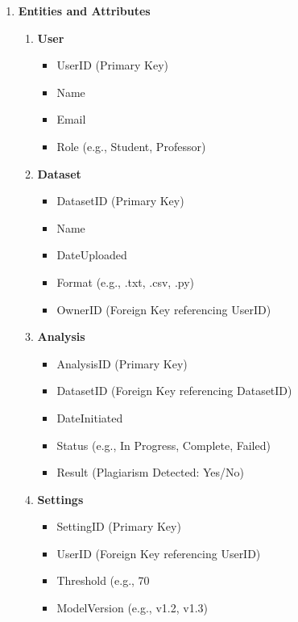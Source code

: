 \documentclass[12pt]{article}
\begin{document}
\begin{enumerate}

    \item \textbf{Entities and Attributes}
    
    \begin{enumerate}

        \item \textbf{User}
        \begin{itemize}
            \item UserID (Primary Key)
            \item Name
            \item Email
            \item Role (e.g., Student, Professor)
        \end{itemize}

        \item \textbf{Dataset}
        \begin{itemize}
            \item DatasetID (Primary Key)
            \item Name
            \item DateUploaded
            \item Format (e.g., .txt, .csv, .py)
            \item OwnerID (Foreign Key referencing UserID)
        \end{itemize}

        \item \textbf{Analysis}
        \begin{itemize}
            \item AnalysisID (Primary Key)
            \item DatasetID (Foreign Key referencing DatasetID)
            \item DateInitiated
            \item Status (e.g., In Progress, Complete, Failed)
            \item Result (Plagiarism Detected: Yes/No)
        \end{itemize}
        
        \item \textbf{Settings}
        \begin{itemize}
            \item SettingID (Primary Key)
            \item UserID (Foreign Key referencing UserID)
            \item Threshold (e.g., 70%
            \item ModelVersion (e.g., v1.2, v1.3)
        \end{itemize}
        

\end{enumerate}
\end{enumerate}
\end{document}

